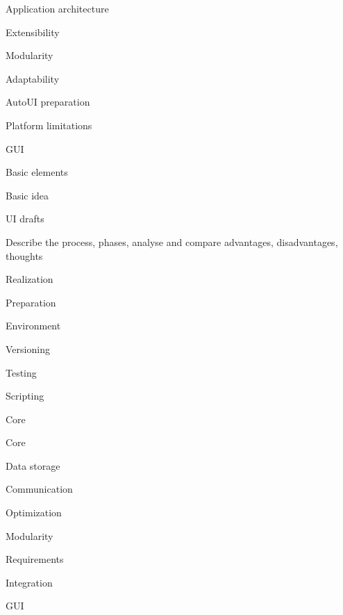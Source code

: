 \sec Application architecture


\secc Extensibility


\secc Modularity


\secc Adaptability


\secc AutoUI preparation


\secc Platform limitations


\sec GUI


\secc Basic elements

Basic idea

\secc UI drafts

Describe the process, phases, analyse and compare advantages, disadvantages, thoughts

\chap Realization


\sec Preparation


\secc Environment


\secc Versioning


\secc Testing


\secc Scripting


\sec Core


\secc Core


\secc Data storage


\secc Communication


\secc Optimization


\sec Modularity


\secc Requirements


\secc Integration


\sec GUI

